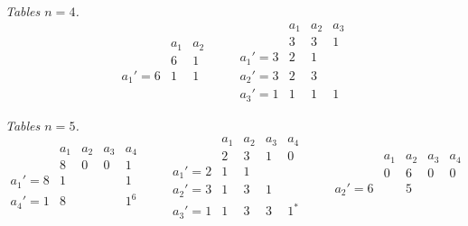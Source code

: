 \documentclass[11pt]{article}
\begin{document}
\noindent\textit{Tables $n=4$.}
\[
\begin{array}{l|cc}
              & a_{1} & a_{2}\\
              & 6     & 1\\
\hline
a_{1}'=6      & 1     & 1
\end{array}
\qquad
\begin{array}{l|ccc}
              & a_{1} & a_{2} & a_{3}\\
              & 3     & 3     & 1\\
\hline
a_{1}'=3      & 2     & 1     & \\
a_{2}'=3      & 2     & 3     & \\
a_{3}'=1      & 1     & 1     & 1
\end{array}
\]


\noindent\textit{Tables $n=5$.}
\[
\begin{array}{l|cccc}
              & a_{1} & a_{2} & a_{3} & a_{4}\\
              & 8     & 0     & 0     & 1\\
\hline
a_{1}'=8      & 1     &       &       & 1\\
a_{4}'=1      & 8     &       &       & 1^{6}
\end{array}
\qquad
\begin{array}{l|cccc}
              & a_{1} & a_{2} & a_{3} & a_{4}\\
              & 2     & 3     & 1     & 0\\
\hline
a_{1}'=2      & 1     & 1     &       & \\
a_{2}'=3      & 1     & 3     & 1     & \\
a_{3}'=1      & 1     & 3     & 3     & 1^{*}
\end{array}
\qquad
\begin{array}{l|cccc}
              & a_{1} & a_{2} & a_{3} & a_{4}\\
              & 0     & 6     & 0     & 0\\
\hline
a_{2}'=6      &       & 5     &       & \\
\end{array}
\]
\end{document}
